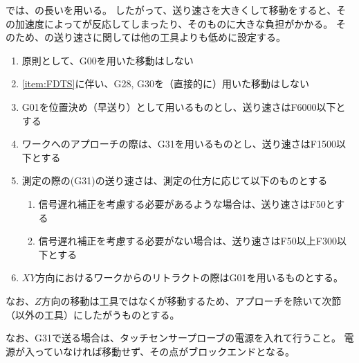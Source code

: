 \clearpage
\modHeadsection{\TouchSensorProbe}
\DMC では、\WorkTotalLength の長い\TouchSensorProbe を用いる。
したがって、送り速さを大きくして移動をすると、その加速度によって\TouchSensorProbe が反応してしまったり、\TouchSensorProbe そのものに大きな負担がかかる。
そのため、\nameTouchSensorProbe の送り速さに関しては他の工具よりも低めに設定する。
\begin{enumerate}[label=\Roman*., ref=\Roman*]
\item \label{item:FDTS} 原則として、{\ttfamily G00}を用いた移動はしない
\item \ref{item:FDTS}に伴い、{\ttfamily G28}, {\ttfamily G30}を（直接的に）用いた移動はしない
\item {\ttfamily G01}を位置決め（早送り）として用いるものとし、送り速さは{\ttfamily F6000}以下とする
\item {}ワークへのアプローチの際は、{\ttfamily G31}を用いるものとし、送り速さは{\ttfamily F1500}以下とする
\item 測定の際の({\ttfamily G31})の送り速さは、測定の仕方に応じて以下のものとする
  \begin{enumerate}
  \item {}信号遅れ補正を考慮する必要があるような場合は、送り速さは{\ttfamily F50}とする
  \item 信号遅れ補正を考慮する必要がない場合は、送り速さは{\ttfamily F50}以上{\ttfamily F300}以下とする
  \end{enumerate}
\item $XY$方向におけるワークからのリトラクトの際は{\ttfamily G01}を用いるものとする。
\end{enumerate}
なお、$Z$方向の移動は工具ではなく\Table が移動するため、アプローチを除いて次節（\TouchSensorProbe 以外の工具）にしたがうものとする。

なお、{\ttfamily G31}で送る場合は、タッチセンサープローブの電源を入れて行うこと。
電源が入っていなければ移動せず、その点がブロックエンドとなる。



